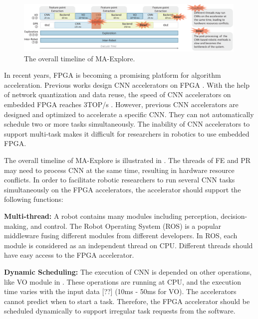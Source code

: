 \begin{figure}[t]
    \centering
	\includegraphics[width=0.99\textwidth]{fig/overalltime.eps} 	
    \caption{
    The overall timeline of MA-Explore.
    }
	\label{fig:overalltime}
\end{figure}


In recent years, FPGA is becoming a promising platform for algorithm acceleration. Previous works design CNN accelerators on FPGA \cite{yu2018instruction,li_high_2016,qiu2016going,lu_evaluating_2017}. With the help of network quantization and data reuse, the speed of CNN accelerators on embedded FPGA reaches 3TOP/s \cite{lu_evaluating_2017}.
However, previous CNN accelerators are designed and optimized to accelerate a specific CNN. They can not automatically schedule two or more tasks simultaneously. 
The inability of CNN accelerators to support multi-task makes it difficult for researchers in robotics to use embedded FPGA.



The overall timeline of MA-Explore is illustrated in . 
The threads of FE and PR may need to process CNN at the same time, resulting in hardware resource conflicts. 
In order to facilitate robotic researchers to run several CNN tasks simultaneously on the FPGA accelerators, the accelerator should support the following functions:

\textbf{Multi-thread:} A robot contains many modules including perception, decision-making, and control. 
The Robot Operating System (ROS) \cite{quigley2009ros} is a popular middleware fusing different modules from different developers. 
In ROS, each module is considered as an independent thread on CPU. 
Different threads should have easy access to the FPGA accelerator.

\textbf{Dynamic Scheduling:} The execution of CNN is depended on other operations, like VO module in . 
These operations are running at CPU, and the execution time varies with the input data [??] (10ms - 50ms for VO). 
The accelerators cannot predict when to start a task. 
Therefore, the FPGA accelerator should be scheduled dynamically to support irregular task requests from the software.


